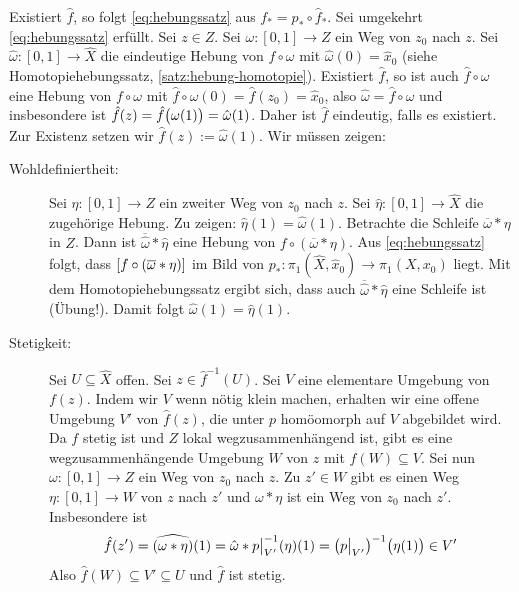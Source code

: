 \begin{beweis}
	Existiert $\hat{f}$, so folgt \eqref{eq:hebungssatz} aus $f_* = p_* \circ\hat{f}_*$. 
	Sei umgekehrt \eqref{eq:hebungssatz} erfüllt. 
	Sei $z\in Z$. Sei $\omega \colon [0,1]\to Z$ ein Weg von $z_0$ nach $z$.
	Sei $\hat{\omega} \colon [0,1] \to \hat{X}$ die eindeutige Hebung von $f \circ \omega$ mit $\hat{\omega}(0)= \hat{x}_0$ (siehe Homotopiehebungssatz, \ref{satz:hebung-homotopie}). 
	Existiert $\hat{f}$, so ist auch $\hat{f} \circ \omega$ eine Hebung von $f \circ \omega$ mit $\hat{f} \circ \omega (0) = \hat{f}(z_0)= \hat{x}_0$, also $\hat{\omega} = \hat{f} \circ \omega$ und insbesondere ist $\hat{f}(z)= \hat{f} \enbrace[\big]{\omega(1)} = \hat{\omega}(1)$. Daher ist $\hat{f}$ eindeutig, falls es existiert. \smallskip \\
	Zur Existenz setzen wir $\hat{f}(z) := \hat{\omega}(1)$. Wir müssen zeigen:
	\begin{description}
		\item[Wohldefiniertheit:] Sei $\eta \colon [0,1] \to Z$ ein zweiter Weg von $z_0$ nach $z$. 
		Sei $\hat{\eta} \colon [0,1] \to \hat{X}$ die zugehörige Hebung. 
		Zu zeigen: $\hat{\eta}(1) = \hat{\omega}(1)$. 
		Betrachte die Schleife $\overline{\omega} * \eta$ in $Z$. 
		Dann ist $\overline{\hat{\omega}} * \hat{\eta}$ eine Hebung von $f \circ (\overline{\omega} * \eta)$. 
		Aus \eqref{eq:hebungssatz} folgt, dass $\benbrace*{f \circ (\overline{\omega} * \eta )}$ im Bild von $p_* \colon \pi_1(\hat{X}, \hat{x}_0) \to \pi_1(X,x_0)$ liegt. 
		Mit dem Homotopiehebungssatz ergibt sich, dass auch $\overline{\hat{\omega}} * \hat{\eta}$ eine Schleife ist (Übung!). 
		Damit folgt $\hat{\omega}(1)= \hat{\eta}(1)$.
		\item[Stetigkeit:] Sei $U \subseteq \hat{X}$ offen. 
		Sei $z \in \hat{f} ^{-1} (U)$. 
		Sei $V$ eine elementare Umgebung von $f(z)$. 
		Indem wir $V$ wenn nötig klein machen, erhalten wir eine offene Umgebung $V'$ von $\hat{f}(z)$, die unter $p$ homöomorph auf $V$ abgebildet wird. 
		Da $f$ stetig ist und $Z$ lokal wegzusammenhängend ist, gibt es eine wegzusammenhängende Umgebung $W$ von $z$ mit $f(W) \subseteq V$. 
		Sei nun $\omega \colon [0,1] \to Z$ ein Weg von $z_0$ nach $z$.
		Zu $z' \in W$ gibt es einen Weg $\eta \colon [0,1] \to W$ von $z$ nach $z'$ und $\omega * \eta$ ist ein Weg von $z_0$ nach $z'$. 
		Insbesondere ist 
		\[
			\hat{f}(z') = \widehat{(\omega * \eta)} (1)= \hat{\omega} * p\big|_{V'} ^{-1} (\eta) (1) = \enbrace*{p \big|_{V'}} ^{-1} \enbrace[\big]{\eta(1)} \in V'  
		\]
		Also $\hat{f}(W) \subseteq V' \subseteq U$ und $\hat{f}$ ist stetig. \qedhere
	\end{description}
\end{beweis}

